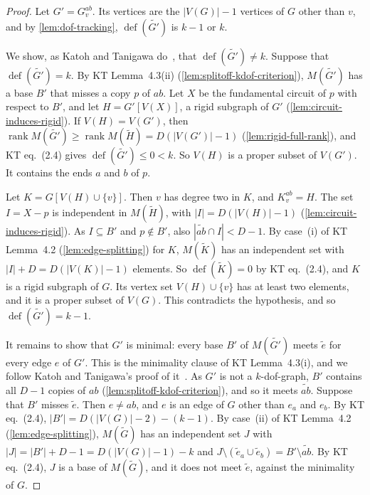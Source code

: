 \begin{proof}
  \leanok
  Let $G' = G_v^{ab}$. Its vertices are the $|V(G)| - 1$ vertices of $G$
  other than $v$, and by \cref{lem:dof-tracking},
  $\operatorname{def}(\widetilde{G'})$ is $k - 1$ or $k$.

  We show, as Katoh and Tanigawa do~\cite[p.~666]{katohTanigawa2011},
  that $\operatorname{def}(\widetilde{G'}) \neq k$. Suppose that
  $\operatorname{def}(\widetilde{G'}) = k$. By KT Lemma~4.3(ii)
  (\cref{lem:splitoff-kdof-criterion}), $M(\widetilde{G'})$ has a base
  $B'$ that misses a copy $p$ of $ab$. Let $X$ be the fundamental circuit
  of $p$ with respect to $B'$, and let $H = G'[V(X)]$, a rigid subgraph
  of $G'$ (\cref{lem:circuit-induces-rigid}). If $V(H) = V(G')$, then
  $\operatorname{rank} M(\widetilde{G'}) \ge \operatorname{rank}
  M(\tilde H) = D(|V(G')| - 1)$ (\cref{lem:rigid-full-rank}), and KT
  eq.~(2.4) gives $\operatorname{def}(\widetilde{G'}) \le 0 < k$. So
  $V(H)$ is a proper subset of $V(G')$. It contains the ends $a$ and $b$
  of $p$.

  Let $K = G[V(H) \cup \{v\}]$. Then $v$ has degree two in $K$, and
  $K_v^{ab} = H$. The set $I = X - p$ is independent in $M(\tilde H)$,
  with $|I| = D(|V(H)| - 1)$ (\cref{lem:circuit-induces-rigid}). As
  $I \subseteq B'$ and $p \notin B'$, also
  $|\widetilde{ab} \cap I| < D - 1$. By case~(i) of KT Lemma~4.2
  (\cref{lem:edge-splitting}) for $K$, $M(\tilde K)$ has an independent
  set with $|I| + D = D(|V(K)| - 1)$ elements. So
  $\operatorname{def}(\tilde K) = 0$ by KT eq.~(2.4), and $K$ is a rigid
  subgraph of $G$. Its vertex set $V(H) \cup \{v\}$ has at least two
  elements, and it is a proper subset of $V(G)$. This contradicts the
  hypothesis, and so $\operatorname{def}(\widetilde{G'}) = k - 1$.

  It remains to show that $G'$ is minimal: every base $B'$ of
  $M(\widetilde{G'})$ meets $\tilde e$ for every edge $e$ of $G'$. This
  is the minimality clause of KT Lemma~4.3(i), and we follow Katoh and
  Tanigawa's proof of it~\cite[p.~661]{katohTanigawa2011}. As $G'$ is
  not a $k$-dof-graph, $B'$ contains all $D - 1$ copies of $ab$
  (\cref{lem:splitoff-kdof-criterion}), and so it meets
  $\widetilde{ab}$. Suppose that $B'$ misses $\tilde e$. Then
  $e \neq ab$, and $e$ is an edge of $G$ other than $e_a$ and $e_b$. By
  KT eq.~(2.4), $|B'| = D(|V(G)| - 2) - (k - 1)$. By case~(ii) of KT
  Lemma~4.2 (\cref{lem:edge-splitting}), $M(\tilde G)$ has an
  independent set $J$ with $|J| = |B'| + D - 1 = D(|V(G)| - 1) - k$ and
  $J \setminus (\tilde e_a \cup \tilde e_b) = B' \setminus \widetilde{ab}$.
  By KT eq.~(2.4), $J$ is a base of $M(\tilde G)$, and it does not meet
  $\tilde e$, against the minimality of $G$.
\end{proof}

